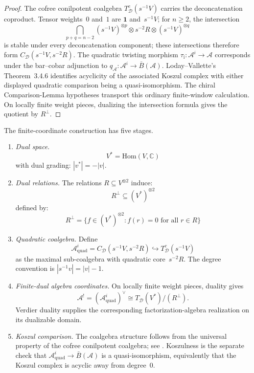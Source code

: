 \begin{proof}
The cofree conilpotent coalgebra $T^c_{\mathcal D}(s^{-1}V)$ carries the
deconcatenation coproduct.  Tensor weights~$0$ and~$1$ are
$\mathbf 1$ and~$s^{-1}V$; for $n\ge2$, the intersection
\[
 \bigcap_{p+q=n-2}(s^{-1}V)^{\otimes p}\otimes s^{-2}R\otimes
 (s^{-1}V)^{\otimes q}
\]
is stable under every deconcatenation component; these intersections
therefore form $C_{\mathcal D}(s^{-1}V,s^{-2}R)$.  The quadratic
twisting morphism
$\tau_{\mathrm i}\colon\mathcal A^i\to\mathcal A$
corresponds under the bar--cobar adjunction to
$q_{\mathcal A}\colon\mathcal A^i\to\bar B(\mathcal A)$.
Loday--Vallette's Theorem~3.4.6 identifies acyclicity of the associated
Koszul complex with either displayed quadratic comparison being a
quasi-isomorphism.  The chiral Comparison-Lemma hypotheses transport
this ordinary finite-window calculation.  On locally finite weight
pieces, dualizing the intersection formula gives the quotient by
$R^\perp$.
\end{proof}

\begin{construction}\label{constr:quadratic-finite-dual-coordinates}
The finite-coordinate construction has five stages.

\begin{enumerate}
\item \emph{Dual space.}
\[V^* = \text{Hom}(V, \mathbb{C})\]
with dual grading: $|v^*| = -|v|$.

\item \emph{Dual relations.}
The relations $R \subseteq V^{\otimes 2}$ induce:
\[R^\perp \subseteq (V^*)^{\otimes 2}\]
defined by:
\[R^\perp = \{f \in (V^*)^{\otimes 2} : f(r) = 0 \text{ for all } r \in R\}\]

\item \emph{Quadratic coalgebra.}
Define
\[
 \mathcal A^i_{\mathrm{quad}}
 =C_{\mathcal D}(s^{-1}V,s^{-2}R)
 \hookrightarrow T^c_{\mathcal D}(s^{-1}V)
\]
as the maximal sub-coalgebra with quadratic core~$s^{-2}R$.
The degree convention is $|s^{-1}v|=|v|-1$.

\item \emph{Finite-dual algebra coordinates.}
On locally finite weight pieces, duality gives
\[
 \mathcal A^!
 =(\mathcal A^i_{\mathrm{quad}})^\vee
 \cong T_{\mathcal D}(V^*)/(R^\perp).
\]
Verdier duality supplies the corresponding factorization-algebra
realization on its dualizable domain.

\item \emph{Koszul comparison.}
The coalgebra structure follows from the universal property of the
cofree conilpotent coalgebra; see \cite[Theorem~7.1.2]{LV12}.
Koszulness is the separate check that
$\mathcal{A}^i_{\mathrm{quad}}\to\bar{B}(\mathcal{A})$ is a
quasi-isomorphism, equivalently that the Koszul complex is acyclic
away from degree~$0$.
\end{enumerate}
\end{construction}

